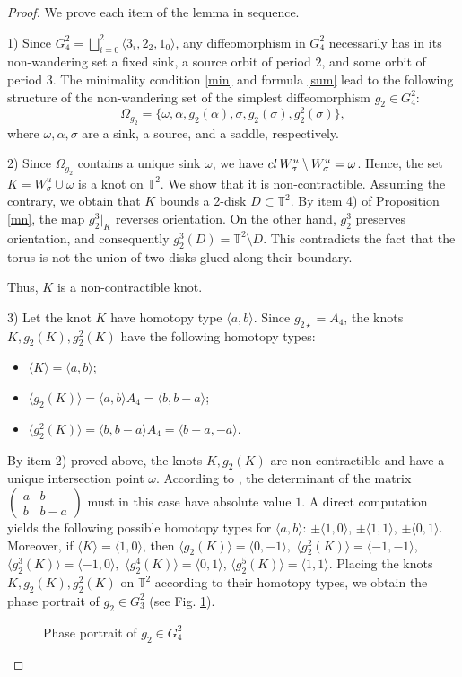 \documentclass[10pt,a4paper]{amsart}
\begin{document}
	\begin{proof} We prove each item of the lemma in sequence.
		
		1) Since $G_4^2=\bigsqcup\limits_{i=0}^2\langle 3_i,2_2,1_0\rangle$, any diffeomorphism in $G^2_4$ necessarily has in its non-wandering set a fixed sink, a source orbit of period $2$, and some orbit of period $3$. The minimality condition \eqref{min} and formula \eqref{sum} lead to the following structure of the non-wandering set of the simplest diffeomorphism $g_2\in G_4^2$:
		$$\Omega_{g_2}=\{\omega,\alpha,g_{2}(\alpha),\sigma,g_{2}(\sigma),g_{2}^2(\sigma)\},$$
		where $\omega,\alpha,\sigma$ are a sink, a source, and a saddle, respectively.
		
		2) Since $\Omega_{g_{2}}$ contains a unique sink $\omega$, we have ${\rm cl}\,W^u_\sigma\setminus W^u_\sigma=\omega$. Hence, the set $K=W^u_\sigma\cup\omega$ is a knot on $\mathbb T^2$. We show that it is non-contractible. Assuming the contrary, we obtain that $K$ bounds a 2-disk $D\subset\mathbb T^2$. By item 4) of Proposition \ref{mn}, the map $g^3_2|_{K}$ reverses orientation. On the other hand, $g^3_2$ preserves orientation, and consequently $g_2^3(D)=\mathbb T^2\setminus D$. This contradicts the fact that the torus is not the union of two disks glued along their boundary.
		
		Thus, $K$ is a non-contractible knot.
		
		3) Let the knot $K$ have homotopy type $\langle a,b\rangle$. Since $g_{{2}\star}=A_4$, the knots $K,g_{2}(K),g_{2}^2(K)$ have the following homotopy types:
		\begin{itemize}
			\item $\langle K\rangle=\langle a,b\rangle$;
			\item $\langle g_{2}(K)\rangle=\langle a,b\rangle A_4=\langle b,b-a\rangle$;
			\item $\langle g_{2}^2(K)\rangle=\langle b,b-a\rangle A_4=\langle b-a,-a\rangle$.
		\end{itemize} 
		By item 2) proved above, the knots $K,g_{2}(K)$ are non-contractible and have a unique intersection point $\omega$. According to \cite{Rol}, the determinant of the matrix $\begin{pmatrix} a & b\\ b& b-a\end{pmatrix}$ must in this case have absolute value $1$. A direct computation yields the following possible homotopy types for $\langle a,b\rangle$: $\pm\langle 1,0\rangle$, $\pm\langle 1,1\rangle$, $\pm\langle 0,1\rangle$. Moreover, if $\langle K\rangle=\langle 1,0\rangle$, then 
		$\langle g_2(K)\rangle=\langle 0,-1\rangle,$ $\langle g^2_2(K)\rangle=\langle -1,-1\rangle$, $\langle g_2^3(K)\rangle=\langle -1,0\rangle,$ $\langle g^4_2(K)\rangle=\langle 0,1\rangle$, $\langle g^5_2(K)\rangle=\langle 1,1\rangle.$ Placing the knots $K,g_{2}(K),g_{2}^2(K)$ on $\mathbb T^2$ according to their homotopy types, we obtain the phase portrait of $g_{2}\in G^2_3$ (see Fig. \ref{picg1}).
		\begin{figure}[h]		
			\centerline{}		
			\caption{\small Phase portrait of $g_{2}\in G^2_4$}\label{picg1}	
		\end{figure}
		

\end{proof}
\end{document}
